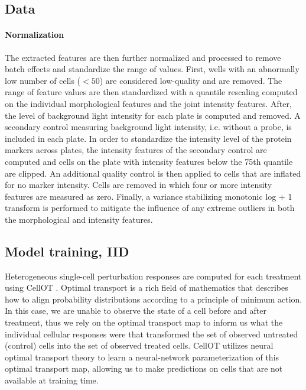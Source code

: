 \subsection{Data}

\paragraph{Normalization}
The extracted features are then further normalized and processed to remove batch effects and standardize the range of values. First, wells with an abnormally low number of cells ($< 50$) are considered low-quality and are removed. The range of feature values are then standardized with a quantile rescaling computed on the individual morphological features and the joint intensity features. After, the level of background light intensity for each plate is computed and removed. A secondary control measuring background light intensity, i.e. without a probe, is included in each plate. In order to standardize the intensity level of the protein markers across plates, the intensity features of the secondary control are computed and cells on the plate with intensity features below the 75th quantile are clipped. An additional quality control is then applied to cells that are inflated for no marker intensity. Cells are removed in which four or more intensity features are measured as zero. Finally, a variance stabilizing monotonic log + 1 transform is performed to mitigate the influence of any extreme outliers in both the morphological and intensity features.


\subsection{Model training, IID}
Heterogeneous single-cell perturbation responses are computed for each treatment using CellOT \cite{bunne2023}. Optimal transport is a rich field of mathematics that describes how to align probability distributions according to a principle of minimum action. In this case, we are unable to observe the state of a cell before and after treatment, thus we rely on the optimal transport map to inform us what the individual cellular responses were that transformed the set of observed untreated (control) cells into the set of observed treated cells. CellOT utilizes neural optimal transport theory to learn a neural-network parameterization of this optimal transport map, allowing us to make predictions on cells that are not available at training time.

